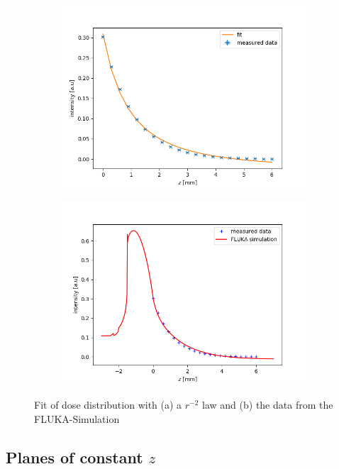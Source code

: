 \documentclass[a4paper,parskip]{scrartcl}
\begin{document}
 \begin{figure}
 \centering
 \begin{subfigure}{0.7\linewidth}
 \includegraphics[width =\linewidth]{Fit_invers_quadratisch.png}
 \caption{}
 \end{subfigure}
  \begin{subfigure}{0.7\linewidth}
 \includegraphics[width =\linewidth]{experiment_simulation_fit.png}
 \caption{}
 \end{subfigure}
 \caption{Fit of dose distribution with (a) a $r ^{-2}$ law and (b) the data from the FLUKA-Simulation}
 \label{radial_fits}
 \end{figure}

\subsection{Planes of constant $z$}
\end{document}
